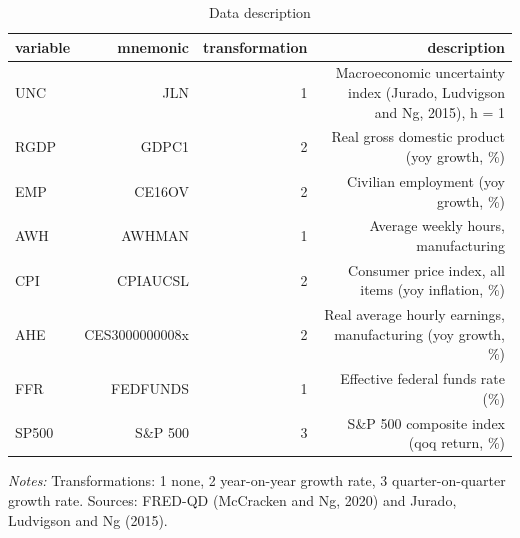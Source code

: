 \begin{table}[htbp]
\centering
\caption{Data description}
\label{tab:data}
\begin{tabular}{lrrr}
\toprule
variable & mnemonic & transformation & description \\
\midrule
UNC & JLN & 1 & Macroeconomic uncertainty index (Jurado, Ludvigson and Ng, 2015), h = 1 \\
RGDP & GDPC1 & 2 & Real gross domestic product (yoy growth, \%) \\
EMP & CE16OV & 2 & Civilian employment (yoy growth, \%) \\
AWH & AWHMAN & 1 & Average weekly hours, manufacturing \\
CPI & CPIAUCSL & 2 & Consumer price index, all items (yoy inflation, \%) \\
AHE & CES3000000008x & 2 & Real average hourly earnings, manufacturing (yoy growth, \%) \\
FFR & FEDFUNDS & 1 & Effective federal funds rate (\%) \\
SP500 & S\&P 500 & 3 & S\&P 500 composite index (qoq return, \%) \\
\bottomrule
\end{tabular}
\begin{minipage}{0.95\linewidth}\footnotesize\emph{Notes:} Transformations: 1 none, 2 year-on-year growth rate, 3 quarter-on-quarter growth rate. Sources: FRED-QD (McCracken and Ng, 2020) and Jurado, Ludvigson and Ng (2015).\end{minipage}
\end{table}
